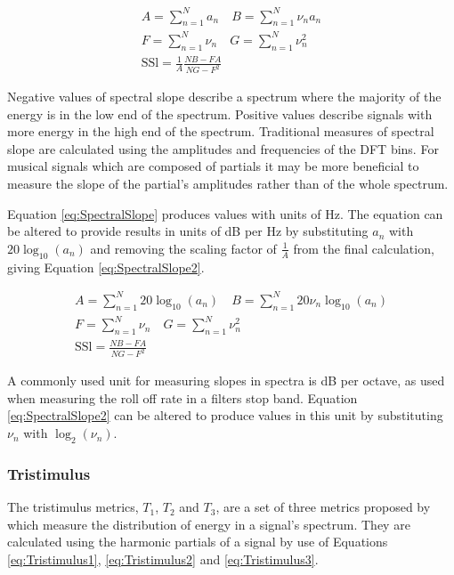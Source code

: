 			\begin{gather}
				A = \sum_{n = 1}^{N} a_{n}
				\quad 
				B = \sum_{n = 1}^{N} \nu_{n}a_{n} \nonumber \\
				F = \sum_{n = 1}^{N} \nu_{n} \quad G = \sum_{n = 1}^{N} \nu_{n}^{2} \nonumber \\
				\mathrm{SSl} = \frac{1}{A} \frac{NB - FA}{NG - F^{2}}
				\label{eq:SpectralSlope}
			\end{gather}

			Negative values of spectral slope describe a spectrum where the majority of the energy is in the
			low end of the spectrum. Positive values describe signals with more energy in the high end of the
			spectrum. Traditional measures of spectral slope are calculated using the amplitudes and
			frequencies of the DFT bins. For musical signals which are composed of partials it may be more
			beneficial to measure the slope of the partial's amplitudes rather than of the whole spectrum. 
			
			Equation \ref{eq:SpectralSlope} produces values with units of Hz. The equation can be
			altered to provide results in units of dB per Hz by substituting $a_{n}$ with $20\log_{10}(a_{n})$
			and removing the scaling factor of $\frac{1}{A}$ from the final calculation, giving Equation
			\ref{eq:SpectralSlope2}.
			
			\begin{gather}
				A = \sum_{n = 1}^{N} 20\log_{10}(a_{n})
				\quad 
				B = \sum_{n = 1}^{N} 20\nu_{n}\log_{10}(a_{n}) \nonumber \\
				F = \sum_{n = 1}^{N} \nu_{n} \quad G = \sum_{n = 1}^{N} \nu_{n}^{2} \nonumber \\
				\mathrm{SSl} = \frac{NB - FA}{NG - F^{2}}
				\label{eq:SpectralSlope2}
			\end{gather}
			
			A commonly used unit for measuring slopes in spectra is dB per octave, as used when measuring the
			roll off rate in a filters stop band. Equation \ref{eq:SpectralSlope2} can be altered to produce
			values in this unit by substituting $\nu_{n}$ with $\log_{2}(\nu_{n})$.

		\subsubsection*{Tristimulus}
			The tristimulus metrics, $T_{1}$, $T_{2}$ and $T_{3}$, are a set of three metrics proposed by
			\citet{pollard1982a} which measure the distribution of energy in a signal's spectrum. They are
			calculated using the harmonic partials of a signal by use of Equations \ref{eq:Tristimulus1},
			\ref{eq:Tristimulus2} and \ref{eq:Tristimulus3}.
			
